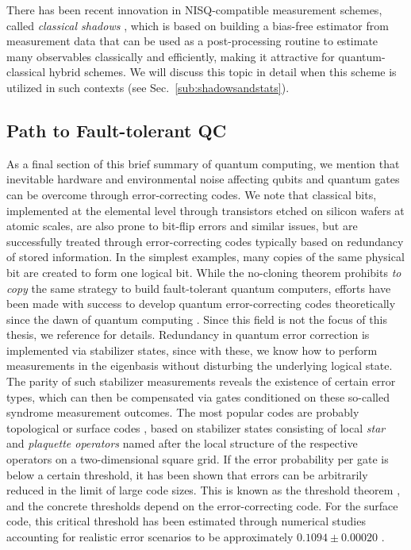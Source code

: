 \documentclass[../main.tex]{subfiles}
\begin{document}
There has been recent innovation in \ac{NISQ}-compatible measurement schemes, called \textit{classical shadows} \cite{huang2020predicting}, which is based on building a bias-free estimator from measurement data that can be used as a post-processing routine to estimate many observables classically and efficiently, making it attractive for quantum-classical hybrid schemes. We will discuss this topic in detail when this scheme is utilized in such contexts (see Sec.~\ref{sub:shadowsandstats}).

\subsection{Path to Fault-tolerant QC}

As a final section of this brief summary of quantum computing, we mention that inevitable hardware and environmental noise affecting qubits and quantum gates can be overcome through error-correcting codes. We note that classical bits, implemented at the elemental level through transistors etched on silicon wafers at atomic scales, are also prone to bit-flip errors and similar issues, but are successfully treated through error-correcting codes typically based on redundancy of stored information. In the simplest examples, many copies of the same physical bit are created to form one logical bit. While the no-cloning theorem prohibits \textit{to copy} the same strategy to build fault-tolerant quantum computers, efforts have been made with success to develop quantum error-correcting codes theoretically since the dawn of quantum computing \cite{shor1995scheme, steane1996error, gottesman1997stabilizer}. Since this field is not the focus of this thesis, we reference  \cite{roffe2019quantum, terhal2013quantum} for details. Redundancy in quantum error correction is implemented via stabilizer states, since with these, we know how to perform measurements in the eigenbasis without disturbing the underlying logical state. The parity of such stabilizer measurements reveals the existence of certain error types, which can then be compensated via gates conditioned on these so-called syndrome measurement outcomes. The most popular codes are probably topological or surface codes  \cite{fowler2012surface}, based on stabilizer states consisting of local \textit{star} and \textit{plaquette operators} named after the local structure of the respective operators on a two-dimensional square grid. If the error probability per gate is below a certain threshold, it has been shown that errors can be arbitrarily reduced in the limit of large code sizes. This is known as the threshold theorem \cite{shor1996fault}, and the concrete thresholds depend on the error-correcting code. For the surface code, this critical threshold has been estimated through numerical studies accounting for realistic error scenarios to be approximately $0.1094 \pm 0.00020$ \cite{dennis2001topological}.
\end{document}
